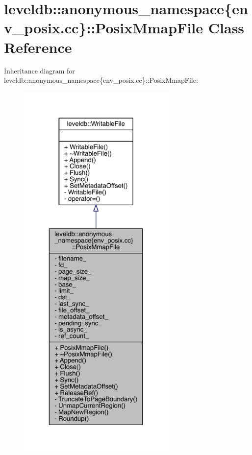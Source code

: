 \hypertarget{classleveldb_1_1anonymous__namespace_02env__posix_8cc_03_1_1_posix_mmap_file}{}\section{leveldb\+:\+:anonymous\+\_\+namespace\{env\+\_\+posix.\+cc\}\+:\+:Posix\+Mmap\+File Class Reference}
\label{classleveldb_1_1anonymous__namespace_02env__posix_8cc_03_1_1_posix_mmap_file}


Inheritance diagram for leveldb\+:\+:anonymous\+\_\+namespace\{env\+\_\+posix.\+cc\}\+:\+:Posix\+Mmap\+File\+:
\nopagebreak
\begin{figure}[H]
\begin{center}
\leavevmode
\includegraphics[height=550pt]{classleveldb_1_1anonymous__namespace_02env__posix_8cc_03_1_1_posix_mmap_file__inherit__graph}
\end{center}
\end{figure}



